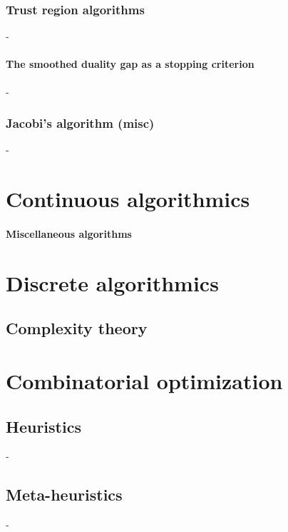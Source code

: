 \documentclass[12pt,openany,oneside]{book}
\theoremstyle{definition}
\numberwithin{definition}{section}
\numberwithin{theorem}{section}
\numberwithin{corollary}{section}
\numberwithin{proposition}{section}
\numberwithin{notation}{section}
\numberwithin{remark}{section}
\numberwithin{hypothesis}{section}
\numberwithin{example}{section}
\begin{document}
\section{Trust region algorithms}-
\subsection{The smoothed duality gap as a stopping criterion}-
\section{Jacobi's algorithm (misc)}-

\part{Continuous algorithmics}
\subsection{Miscellaneous algorithms}

\part{Discrete algorithmics}

\chapter{Complexity theory}



\part{Combinatorial optimization}

\chapter{Heuristics}\label{chap:heuristics}-
\chapter{Meta-heuristics}\label{chap:meta-heuristics}-
\end{document}
